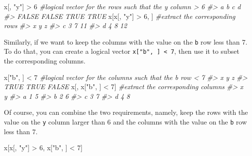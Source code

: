 \documentclass[
]{book}
\newenvironment{Shaded}{\begin{snugshade}}{\end{snugshade}}
\newcommand{\CommentTok}[1]{\textcolor[rgb]{0.56,0.35,0.01}{\textit{#1}}}
\newcommand{\DecValTok}[1]{\textcolor[rgb]{0.00,0.00,0.81}{#1}}
\newcommand{\NormalTok}[1]{#1}
\newcommand{\SpecialCharTok}[1]{\textcolor[rgb]{0.00,0.00,0.00}{#1}}
\newcommand{\StringTok}[1]{\textcolor[rgb]{0.31,0.60,0.02}{#1}}
\begin{document}
\begin{Shaded}
\begin{Highlighting}[]
\NormalTok{x[, }\StringTok{"y"}\NormalTok{] }\SpecialCharTok{\textgreater{}} \DecValTok{6}       \CommentTok{\#logical vector for the rows such that the \textasciigrave{}y\textasciigrave{} column \textgreater{} 6}
\CommentTok{\#\textgreater{}     a     b     c     d }
\CommentTok{\#\textgreater{} FALSE FALSE  TRUE  TRUE}
\NormalTok{x[x[, }\StringTok{"y"}\NormalTok{] }\SpecialCharTok{\textgreater{}} \DecValTok{6}\NormalTok{, ]  }\CommentTok{\#extract the corresponding rows}
\CommentTok{\#\textgreater{}   x y  z}
\CommentTok{\#\textgreater{} c 3 7 11}
\CommentTok{\#\textgreater{} d 4 8 12}
\end{Highlighting}
\end{Shaded}

Similarly, if we want to keep the columns with the value on the \texttt{b} row less than 7. To do that, you can create a logical vector \texttt{x{[}"b",\ {]}\ \textless{}\ 7}, then use it to subset the corresponding columns.

\begin{Shaded}
\begin{Highlighting}[]
\NormalTok{x[}\StringTok{"b"}\NormalTok{, ] }\SpecialCharTok{\textless{}} \DecValTok{7}       \CommentTok{\#logical vector for the columns such that the \textasciigrave{}b\textasciigrave{} row \textless{} 7}
\CommentTok{\#\textgreater{}     x     y     z }
\CommentTok{\#\textgreater{}  TRUE  TRUE FALSE}
\NormalTok{x[, x[}\StringTok{"b"}\NormalTok{, ] }\SpecialCharTok{\textless{}} \DecValTok{7}\NormalTok{]  }\CommentTok{\#extract the corresponding columns}
\CommentTok{\#\textgreater{}   x y}
\CommentTok{\#\textgreater{} a 1 5}
\CommentTok{\#\textgreater{} b 2 6}
\CommentTok{\#\textgreater{} c 3 7}
\CommentTok{\#\textgreater{} d 4 8}
\end{Highlighting}
\end{Shaded}

Of course, you can combine the two requirements, namely, keep the rows with the value on the \texttt{y} column larger than 6 and the columns with the value on the \texttt{b} row less than 7.

\begin{Shaded}
\begin{Highlighting}[]
\NormalTok{x[x[, }\StringTok{"y"}\NormalTok{] }\SpecialCharTok{\textgreater{}} \DecValTok{6}\NormalTok{, x[}\StringTok{"b"}\NormalTok{, ] }\SpecialCharTok{\textless{}} \DecValTok{7}\NormalTok{] }
\end{Highlighting}
\end{Shaded}
\end{document}
